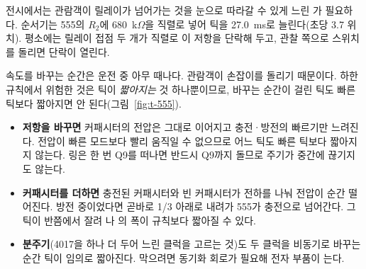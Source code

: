 전시에서는 관람객이 릴레이가 넘어가는 것을 눈으로 따라갈 수 있게 느린 가
필요하다. 순서기는 555의 $R_2$에 680~k$\Omega$을 직렬로 넣어 틱을 27.0~ms로 늘린다(초당 3.7 위치). 평소에는
릴레이 접점 두 개가 직렬로 이 저항을 단락해 두고, 관찰 쪽으로 스위치를 돌리면 단락이 열린다.

\Why 속도를 바꾸는 순간은 운전 중 아무 때나다. 관람객이 손잡이를 돌리기 때문이다. 하한 규칙에서 위험한 것은
틱이 \emph{짧아지는} 것 하나뿐이므로, 바꾸는 순간이 걸린 틱도 빠른 틱보다 짧아지면 안 된다(그림~\ref{fig:t-555}).

\begin{itemize}
\item \textbf{저항을 바꾸면} 커패시터의 전압은 그대로 이어지고 충전·방전의 빠르기만 느려진다. 전압이 빠른
모드보다 빨리 움직일 수 없으므로 어느 틱도 빠른 틱보다 짧아지지 않는다. 링은 한 번 Q9를 떠나면 반드시 Q9까지
돌므로 주기가 중간에 끊기지도 않는다.
\item \textbf{커패시터를 더하면} 충전된 커패시터와 빈 커패시터가 전하를 나눠 전압이 순간 떨어진다. 방전 중이었다면
곧바로 1/3 아래로 내려가 555가 충전으로 넘어간다. 그 틱이 반쯤에서 잘려 나 의 폭이
규칙보다 짧아질 수 있다.
\item \textbf{분주기}(4017을 하나 더 두어 느린 클럭을 고르는 것)도 두 클럭을 비동기로 바꾸는 순간 틱이 임의로
짧아진다. 막으려면 동기화 회로가 필요해 전자 부품이 는다.
\end{itemize}


